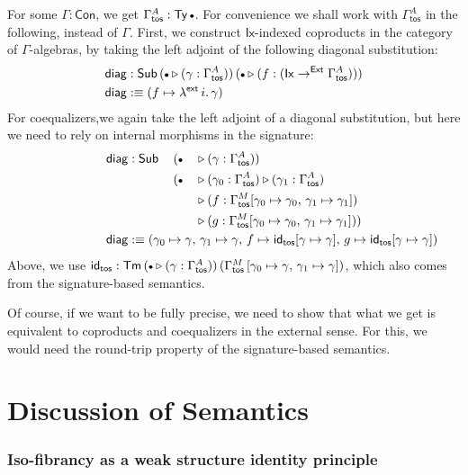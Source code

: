 \documentclass[12pt,a4paper,twoside,openany]{book}
\theoremstyle{remark}
\theoremstyle{definition}
\theoremstyle{theorem}
\newcommand{\ms}[1]{\mathsf{#1}}
\newcommand{\id}{\mathsf{id}}
\newcommand{\Con}{\mathsf{Con}}
\newcommand{\Sub}{\mathsf{Sub}}
\newcommand{\Tm}{\mathsf{Tm}}
\newcommand{\Ty}{\mathsf{Ty}}
\newcommand{\ext}{\triangleright}
\newcommand{\emptycon}{\scaleobj{.75}\bullet}
\newcommand{\toe}{\to^{\ms{Ext}}}
\newcommand{\defn}{:\equiv}
\begin{document}
For some $\Gamma : \Con$, we get $\Gamma^A_{\ms{tos}} : \Ty\,\emptycon$. For
convenience we shall work with $\Gamma^A_{\ms{tos}}$ in the following, instead of $\Gamma$. First, we
construct $\ms{Ix}$-indexed coproducts in the category of $\Gamma$-algebras, by
taking the left adjoint of the following diagonal substitution:
\begin{alignat*}{3}
  &\ms{diag} : \Sub\,(\emptycon\ext(\gamma : \Gamma^A_{\ms{tos}}))\,(\emptycon\ext (f : (\ms{Ix} \toe \Gamma^A_{\ms{tos}})))\\
  &\ms{diag} \defn (f \mapsto \lambda^{\ms{ext}}\,i.\,\gamma)
\end{alignat*}
For coequalizers,we again take the left adjoint of a diagonal substitution, but
here we need to rely on internal morphisms in the signature:
\begin{alignat*}{3}
  &\ms{diag} : \Sub\,&&(\emptycon&&\ext(\gamma : \Gamma^A_{\ms{tos}}))\\
  &&&(\emptycon&&\ext (\gamma_0 : \Gamma^A_{\ms{tos}}) \ext (\gamma_1 : \Gamma^A_{\ms{tos}})\\
  &&&&&\ext (f : \Gamma^M_{\ms{tos}}[\gamma_0 \mapsto \gamma_0,\,\gamma_1 \mapsto \gamma_1])\\
  &&&&&\ext (g : \Gamma^M_{\ms{tos}}[\gamma_0 \mapsto \gamma_0,\,\gamma_1 \mapsto \gamma_1]))\\
  &\rlap{$\ms{diag} \defn (\gamma_0 \mapsto \gamma,\,\gamma_1 \mapsto \gamma,\,f \mapsto \id_{\ms{tos}}[\gamma \mapsto \gamma],\,
           g \mapsto \id_{\ms{tos}}[\gamma \mapsto \gamma]) $}
\end{alignat*}
Above, we use $\id_{\ms{tos}} : \Tm\,(\emptycon\ext(\gamma :
\Gamma^A_{\ms{tos}}))\,(\Gamma^M_{\ms{tos}}\,[\gamma_0 \mapsto \gamma,\,\gamma_1
  \mapsto \gamma])$, which also comes from the signature-based semantics.

Of course, if we want to be fully precise, we need to show that what we get is
equivalent to coproducts and coequalizers in the external sense. For this, we
would need the round-trip property of the signature-based semantics.

\section{Discussion of Semantics}

\subsubsection{Iso-fibrancy as a weak structure identity principle}
\end{document}
